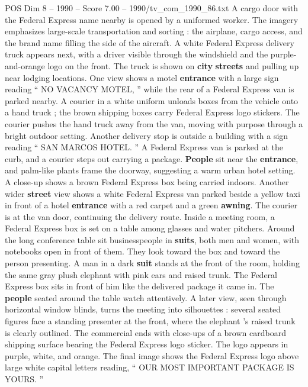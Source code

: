 \begin{textsample}{POS Dim 8 – 1990 – Score 7.00 – 1990/tv\_com\_1990\_86.txt}
A cargo door with the Federal Express name nearby is opened by a uniformed worker.
The imagery emphasizes large-scale transportation and sorting : the airplane, cargo access, and the brand name filling the side of the aircraft.
A white Federal Express delivery truck appears next, with a driver visible through the windshield and the purple-and-orange logo on the front.
The truck is shown on \textbf{city} \textbf{streets} and pulling up near lodging locations.
One view shows a motel \textbf{entrance} with a large sign reading “ NO VACANCY MOTEL, ” while the rear of a Federal Express van is parked nearby.
A courier in a white uniform unloads boxes from the vehicle onto a hand truck ; the brown shipping boxes carry Federal Express logo stickers.
The courier pushes the hand truck away from the van, moving with purpose through a bright outdoor setting.
Another delivery stop is outside a building with a sign reading “ SAN MARCOS HOTEL. ” A Federal Express van is parked at the curb, and a courier steps out carrying a package. \textbf{People} sit near the \textbf{entrance}, and palm-like plants frame the doorway, suggesting a warm urban hotel setting.
A close-up shows a brown Federal Express box being carried indoors.
Another wider \textbf{street} view shows a white Federal Express van parked beside a yellow taxi in front of a hotel \textbf{entrance} with a red carpet and a green \textbf{awning}.
The courier is at the van door, continuing the delivery route.
Inside a meeting room, a Federal Express box is set on a table among glasses and water pitchers.
Around the long conference table sit businesspeople in \textbf{suits}, both men and women, with notebooks open in front of them.
They look toward the box and toward the person presenting.
A man in a dark \textbf{suit} stands at the front of the room, holding the same gray plush elephant with pink ears and raised trunk.
The Federal Express box sits in front of him like the delivered package it came in.
The \textbf{people} seated around the table watch attentively.
A later view, seen through horizontal window blinds, turns the meeting into silhouettes : several seated figures face a standing presenter at the front, where the elephant ’s raised trunk is clearly outlined.
The commercial ends with close-ups of a brown cardboard shipping surface bearing the Federal Express logo sticker.
The logo appears in purple, white, and orange.
The final image shows the Federal Express logo above large white capital letters reading, “ OUR MOST IMPORTANT PACKAGE IS YOURS. ”

\end{textsample}
